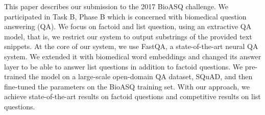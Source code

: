 This paper describes our submission to the 2017 BioASQ challenge. We participated in Task B, Phase B which is concerned with biomedical question answering (QA). We focus on factoid and list question, using an extractive QA model, that is, we restrict our system to output  substrings of the provided text snippets. At the core of our system, we use FastQA, a state-of-the-art neural QA system. We extended it with biomedical word embeddings and changed its answer layer to be able to answer list questions in addition to factoid questions. We pre-trained the model on a large-scale open-domain QA dataset, SQuAD, and then fine-tuned the parameters on the BioASQ training set. With our approach, we achieve state-of-the-art results on factoid questions and competitive results on list questions.
